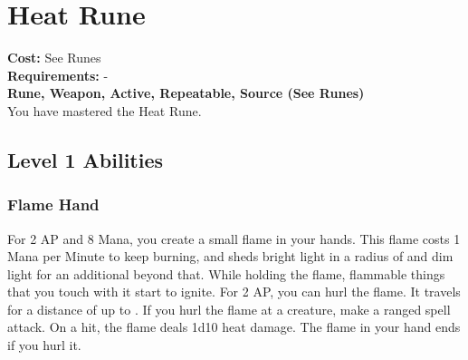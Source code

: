 \twocolumn
\section{Heat Rune}\label{rune:heat}
\textbf{Cost:} See Runes\\
\textbf{Requirements:} -\\
\textbf{Rune, Weapon, Active, Repeatable, Source (See Runes)}\\
You have mastered the Heat Rune.

\subsection{Level 1 Abilities}

\subsubsection{Flame Hand}
For 2 AP and 8 Mana, you create a small flame in your hands.
This flame costs 1 Mana per Minute to keep burning, and sheds bright light in a radius of  and dim light for an additional  beyond that.
While holding the flame, flammable things that you touch with it start to ignite.
For 2 AP, you can hurl the flame.
It travels for a distance of up to .
If you hurl the flame at a creature, make a ranged spell attack.
On a hit, the flame deals 1d10 heat damage.
The flame in your hand ends if you hurl it.